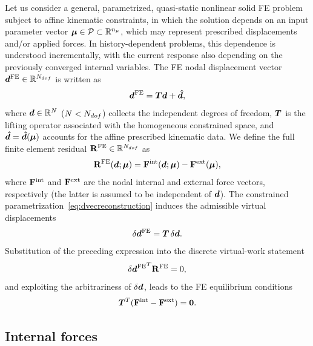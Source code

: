 \documentclass[preprint,10pt]{elsarticle}  %
\begin{document}

Let us  consider a general,  parametrized, quasi-static nonlinear solid FE problem
subject to affine kinematic constraints, in which  the solution
  depends on an input parameter vector
\(\bm{\mu}\in\mathcal{P}\subset\mathbb{R}^{n_{\mu}}\), which may
represent   prescribed displacements  and/or  applied forces.   In history-dependent problems, this
dependence is understood incrementally, with the current response also
depending on the previously converged internal variables. The FE nodal displacement vector $\bm{d}^{\mathrm{FE}} \in \mathbb{R}^{N_{dof}}$ is written as
\begin{equation}
\label{eq:dvecreconstruction}
 \bm{d}^{\mathrm{FE}} = \bm{T} \bm{d}  + \bm{\hat{d}} ,
\end{equation}
where \(\bm{d}\in\mathbb{R}^{N}\)  ($N < N_{dof}$) collects the independent degrees of freedom,
\(\bm{T}\) is the lifting operator associated with the homogeneous constrained
space, and \(\bm{\hat{d}}=\bm{\hat{d}}(\bm{\mu})\) accounts for the affine prescribed
kinematic data. We define the full finite element residual $\mathbf{R}^{\mathrm{FE}} \in \mathbb{R}^{N_{dof}}$ as
\begin{equation}
\label{eq:Rfe_definition}
    \mathbf{R}^{\mathrm{FE}}(\bm{d};\bm{\mu})
    =
    \mathbf{F}^{\mathrm{int}}(\bm{d};\bm{\mu})-\mathbf{F}^{\mathrm{ext}}(\bm{\mu}),
\end{equation}
where \(\mathbf{F}^{\mathrm{int}}\) and \(\mathbf{F}^{\mathrm{ext}}\) are the nodal internal and external force
vectors, respectively (the latter is assumed to be independent of $\bm{d}$).  The constrained parametrization~\eqref{eq:dvecreconstruction} induces the
admissible virtual displacements
\begin{equation}
\label{eq:dvecvariations}
    \delta\bm{d}^{\mathrm{FE}}=\bm{T}\,\delta\bm{d} .
\end{equation}
Substitution of the preceding expression  into the discrete virtual-work statement
\begin{equation}
\label{eq:ResFE}
 {\delta\bm{d}^{\mathrm{FE}}}^T\mathbf{R}^{\mathrm{FE}}=0,
\end{equation}
and exploiting the arbitrariness of $\delta \bm{d}$, leads to the FE equilibrium conditions
\begin{equation}
\label{eq:FOM_equilibrium_lifted}
         \bm{T}^T (\mathbf{F}^{\mathrm{int}} - \mathbf{F}^{\mathrm{ext}})  = \bm{0}.
 \end{equation}

\subsection{Internal forces}
\label{sec:FOM_gauss_decomposition}
\end{document}
